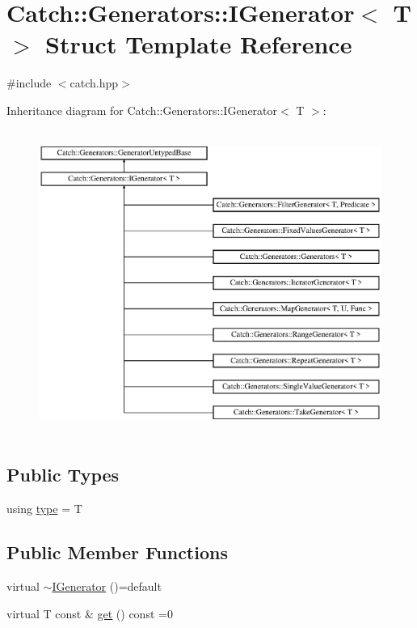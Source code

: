 \hypertarget{struct_catch_1_1_generators_1_1_i_generator}{}\section{Catch\+:\+:Generators\+:\+:I\+Generator$<$ T $>$ Struct Template Reference}
\label{struct_catch_1_1_generators_1_1_i_generator}


{\ttfamily \#include $<$catch.\+hpp$>$}

Inheritance diagram for Catch\+:\+:Generators\+:\+:I\+Generator$<$ T $>$\+:\begin{figure}[H]
\begin{center}
\leavevmode
\includegraphics[height=10.000000cm]{struct_catch_1_1_generators_1_1_i_generator}
\end{center}
\end{figure}
\subsection*{Public Types}
\begin{DoxyCompactItemize}
\item 
using \mbox{\hyperlink{struct_catch_1_1_generators_1_1_i_generator_a1f8677875fe0ff31f39c60d45504b9a5}{type}} = T
\end{DoxyCompactItemize}
\subsection*{Public Member Functions}
\begin{DoxyCompactItemize}
\item 
virtual \mbox{\hyperlink{struct_catch_1_1_generators_1_1_i_generator_afe5b6eecbbd735e69748d68574611747}{$\sim$\+I\+Generator}} ()=default
\item 
virtual T const  \& \mbox{\hyperlink{struct_catch_1_1_generators_1_1_i_generator_a525d381fc9249a885b075a0632a8579a}{get}} () const =0
\end{DoxyCompactItemize}


